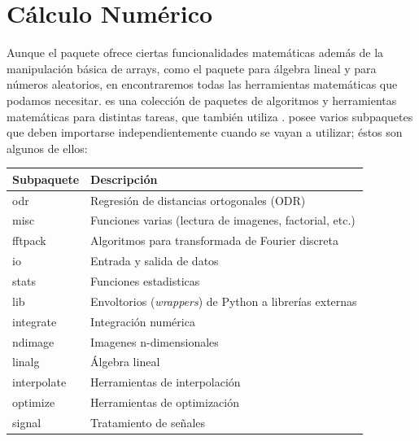 \documentclass[letterpaper,10pt,spanish]{sphinxmanual}
\begin{document}
\chapter{Cálculo Numérico}
\label{calculo_numerico:calculo-numerico}\label{calculo_numerico::doc}
Aunque el paquete  ofrece ciertas funcionalidades matemáticas además de la manipulación básica de arrays, como el paquete  para álgebra lineal y  para números aleatorios, en  encontraremos todas las herramientas matemáticas que podamos necesitar.  es una colección de paquetes de algoritmos y herramientas matemáticas para distintas tareas, que también utiliza .  posee varios subpaquetes que deben importarse independientemente cuando se vayan a utilizar; éstos son algunos de ellos:

\begin{tabulary}{\linewidth}{|L|L|}
\hline
\textbf{
Subpaquete
} & \textbf{
Descripción
}\\
\hline

odr
 & 
Regresión de distancias ortogonales (ODR)
\\

misc
 & 
Funciones varias (lectura de imagenes, factorial, etc.)
\\

fftpack
 & 
Algoritmos para transformada de Fourier discreta
\\

io
 & 
Entrada y salida de datos
\\

stats
 & 
Funciones estadisticas
\\

lib
 & 
Envoltorios (\emph{wrappers}) de Python a librerías externas
\\

integrate
 & 
Integración numérica
\\

ndimage
 & 
Imagenes n-dimensionales
\\

linalg
 & 
Álgebra lineal
\\

interpolate
 & 
Herramientas de interpolación
\\

optimize
 & 
Herramientas de optimización
\\

signal
 & 
Tratamiento de señales
\\
\hline
\end{tabulary}
\end{document}
